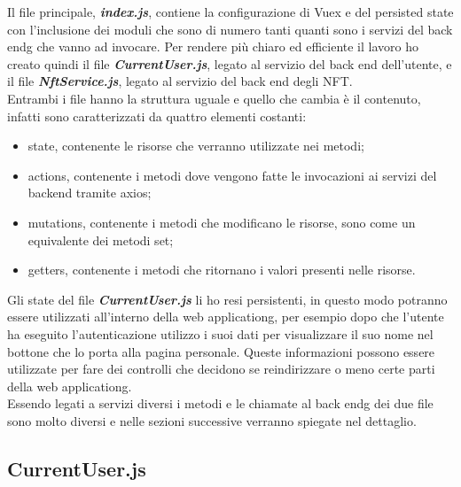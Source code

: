 Il file principale, \textbf{\textit{index.js}}, contiene la configurazione di Vuex e del persisted state con l'inclusione dei moduli che sono di numero tanti quanti sono i servizi del \gls{back endg} che vanno ad invocare. Per rendere più chiaro ed efficiente il lavoro ho creato quindi il file \textbf{\textit{CurrentUser.js}}, legato al servizio del back end dell'utente, e il file \textbf{\textit{NftService.js}}, legato al servizio del back end degli NFT.\\
Entrambi i file hanno la struttura uguale e quello che cambia è il contenuto, infatti sono caratterizzati da quattro elementi costanti:
\begin{itemize}
	\item state, contenente le risorse che verranno utilizzate nei metodi;
	\item actions, contenente i metodi dove vengono fatte le invocazioni ai servizi del backend tramite axios;
	\item mutations, contenente i metodi che modificano le risorse, sono come un equivalente dei metodi set;
	\item getters, contenente i metodi che ritornano i valori presenti nelle risorse.
\end{itemize}

Gli state del file \textbf{\textit{CurrentUser.js}} li ho resi persistenti, in questo modo potranno essere utilizzati all'interno della \gls{web applicationg}, per esempio dopo che l'utente ha eseguito l'autenticazione utilizzo i suoi dati per visualizzare il suo nome nel bottone che lo porta alla pagina personale. Queste informazioni possono essere utilizzate per fare dei controlli che decidono se reindirizzare o meno certe parti della \gls{web applicationg}.\\
Essendo legati a servizi diversi i metodi e le chiamate al \gls{back endg} dei due file sono molto diversi e nelle sezioni successive verranno spiegate nel dettaglio.

\subsection{CurrentUser.js}
\label{subsec:currentuser}

